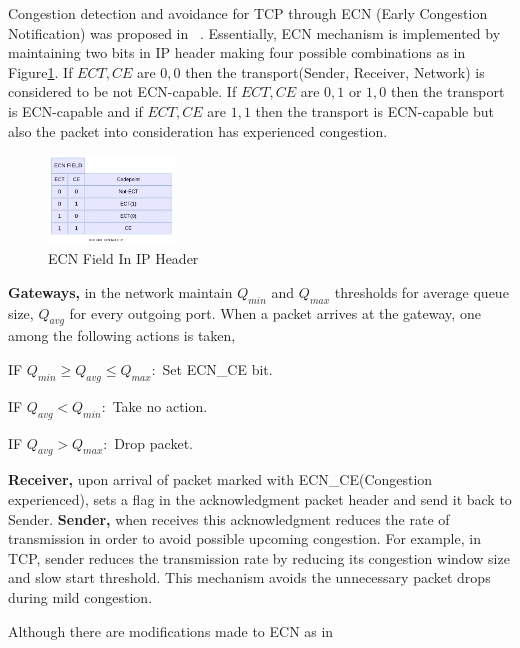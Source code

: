 Congestion detection and avoidance for TCP through ECN (Early Congestion Notification) 
was proposed in ~\cite{floyd1994tcp}. Essentially, ECN mechanism is implemented by 
maintaining two bits in IP header making four possible combinations as in 
Figure\ref{fig:ecn_field}. If $ECT, CE$ are $0,0$ then the transport(Sender, Receiver, Network)
is considered to be not ECN-capable. If $ECT, CE$ are $0, 1$ or $1, 0$ then the transport is
ECN-capable and if $ECT, CE$ are $1, 1$ then the transport is ECN-capable but also the packet into
consideration has experienced congestion. 

\begin{figure}[htb]
  \begin{center}
    \includegraphics[width=0.30\textwidth]{Figures/iccps2014/ecn_field_in_ip.png}
  \caption{ECN Field In IP Header}
  \label{fig:ecn_field}
  \end{center}
\end{figure}

{\bf Gateways,} in the network maintain $Q_{min}$ and $Q_{max}$ thresholds for average queue size, $Q_{avg}$ for every
outgoing port. When a packet arrives at the gateway, one among the following actions is taken,

IF $Q_{min} \geq Q_{avg} \leq Q_{max}:$ Set ECN\_CE bit. 

IF $Q_{avg} < Q_{min}:$ Take no action.

IF $Q_{avg} > Q_{max}:$ Drop packet.

{\bf Receiver,} upon arrival of packet marked with ECN\_CE(Congestion experienced), sets a flag in the acknowledgment 
packet header and send it back to Sender.
{\bf Sender,} when receives this acknowledgment reduces the rate of transmission in order to avoid possible upcoming 
congestion. For example, in TCP, sender reduces the transmission rate by reducing its congestion window size and slow start threshold.
This mechanism avoids the unnecessary packet drops during mild congestion.

	Although there are modifications made to ECN as in~\cite{hadidraft}











